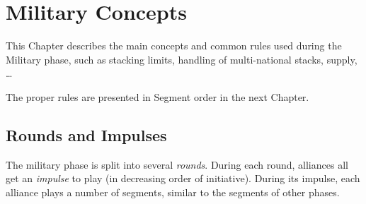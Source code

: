 
\chapter{Military Concepts}\label{chapter:MilitaryConcepts}

\begin{designnote}
  This Chapter describes the main concepts and common rules used
  during the Military phase, such as stacking limits, handling of
  multi-national stacks, supply, \ldots

  The proper rules are presented in Segment order in the next
  Chapter.
\end{designnote}

\section{Rounds and Impulses}
The military phase is split into several \emph{rounds}. During each round,
alliances all get an \emph{impulse} to play (in decreasing order of
initiative). During its impulse, each alliance plays a number of segments,
similar to the segments of other phases.



